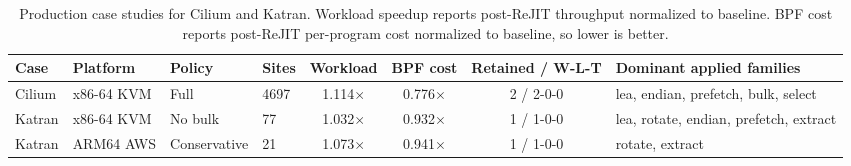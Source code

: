 \begin{table}[t]
\centering
\small
\caption{Production case studies for Cilium and Katran. Workload speedup reports post-ReJIT throughput normalized to baseline. BPF cost reports post-ReJIT per-program cost normalized to baseline, so lower is better.}
\label{tab:eval-kinsn-case-studies}
\begin{tabular}{@{}llllcccl@{}}
\toprule
Case & Platform & Policy & Sites & Workload & BPF cost & Retained / W-L-T & Dominant applied families \\
\midrule
Cilium & x86-64 KVM & Full & 4697 & 1.114$\times$ & 0.776$\times$ & 2 / 2-0-0 & lea, endian, prefetch, bulk, select \\
Katran & x86-64 KVM & No bulk & 77 & 1.032$\times$ & 0.932$\times$ & 1 / 1-0-0 & lea, rotate, endian, prefetch, extract \\
Katran & ARM64 AWS & Conservative & 21 & 1.073$\times$ & 0.941$\times$ & 1 / 1-0-0 & rotate, extract \\
\bottomrule
\end{tabular}
\end{table}

